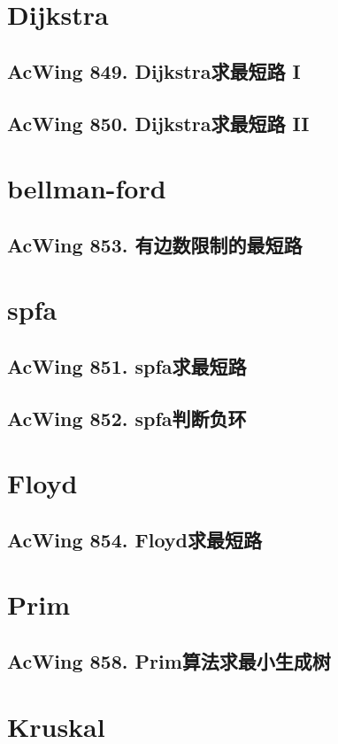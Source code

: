 \section{Dijkstra}
\subsection{AcWing 849. Dijkstra求最短路 I}
\subsection{AcWing 850. Dijkstra求最短路 II}

\section{bellman-ford}
\subsection{AcWing 853. 有边数限制的最短路}

\section{spfa}
\subsection{AcWing 851. spfa求最短路}
\subsection{AcWing 852. spfa判断负环}

\section{Floyd}
\subsection{AcWing 854. Floyd求最短路}

\section{Prim}
\subsection{AcWing 858. Prim算法求最小生成树}

\section{Kruskal}
